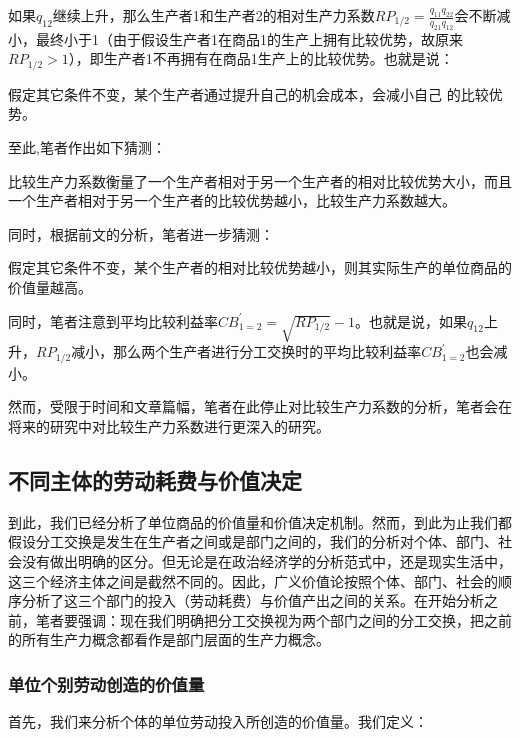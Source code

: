 如果$ q_{12} $继续上升，那么生产者1和生产者2的相对生产力系数$ \mathit{RP}_{1/2} = \frac{q_{11}q_{22}}{q_{21}q_{12}} $会不断减小，最终小于1（由于假设生产者1在商品1的生产上拥有比较优势，故原来$ \mathit{RP}_{1/2} > 1 $），即生产者1不再拥有在商品1生产上的比较优势。也就是说：

\begin{proposition}
    假定其它条件不变，某个生产者通过提升自己的机会成本，会减小自己 的比较优势。
\end{proposition}

至此,笔者作出如下猜测：

\begin{conjecture}
    比较生产力系数衡量了一个生产者相对于另一个生产者的相对比较优势大小，而且一个生产者相对于另一个生产者的比较优势越小，比较生产力系数越大。
\end{conjecture}

同时，根据前文的分析，笔者进一步猜测：

\begin{conjecture}
    假定其它条件不变，某个生产者的相对比较优势越小，则其实际生产的单位商品的价值量越高。
\end{conjecture}

同时，笔者注意到平均比较利益率$ \mathit{CB}^{\prime}_{1=2} = \sqrt{\mathit{RP}_{1/2}} - 1 $。也就是说，如果$ q_{12} $上升，$ \mathit{RP}_{1/2} $减小，那么两个生产者进行分工交换时的平均比较利益率$ \mathit{CB}^{\prime}_{1=2} $也会减小。

然而，受限于时间和文章篇幅，笔者在此停止对比较生产力系数的分析，笔者会在将来的研究中对比较生产力系数进行更深入的研究。

\subsection{不同主体的劳动耗费与价值决定}

到此，我们已经分析了单位商品的价值量和价值决定机制。然而，到此为止我们都假设分工交换是发生在生产者之间或是部门之间的，我们的分析对个体、部门、社会没有做出明确的区分。但无论是在政治经济学的分析范式中，还是现实生活中，这三个经济主体之间是截然不同的。因此，广义价值论按照个体、部门、社会的顺序分析了这三个部门的投入（劳动耗费）与价值产出之间的关系。在开始分析之前，笔者要强调：现在我们明确把分工交换视为两个部门之间的分工交换，把之前的所有生产力概念都看作是部门层面的生产力概念。

\subsubsection{单位个别劳动创造的价值量}
首先，我们来分析个体的单位劳动投入所创造的价值量。我们定义：

